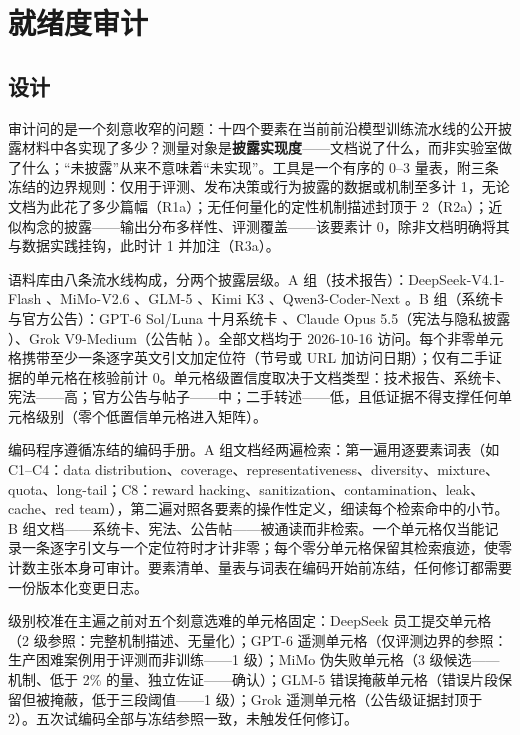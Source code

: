 \documentclass[10pt,fontset=fandol]{ctexart}
\begin{document}
\section{就绪度审计}

\subsection{设计}

审计问的是一个刻意收窄的问题：十四个要素在当前前沿模型训练流水线的公开披露材料中各实现了多少？测量对象是\textbf{披露实现度}——文档说了什么，而非实验室做了什么；“未披露”从来不意味着“未实现”。工具是一个有序的 0--3 量表，附三条冻结的边界规则：仅用于评测、发布决策或行为披露的数据或机制至多计 1，无论文档为此花了多少篇幅（R1a）；无任何量化的定性机制描述封顶于 2（R2a）；近似构念的披露——输出分布多样性、评测覆盖——该要素计 0，除非文档明确将其与数据实践挂钩，此时计 1 并加注（R3a）。

语料库由八条流水线构成，分两个披露层级。A 组（技术报告）：DeepSeek-V4.1-Flash \cite{ref20}、MiMo-V2.6 \cite{ref26}、GLM-5 \cite{ref27}、Kimi K3 \cite{ref31}、Qwen3-Coder-Next \cite{ref28}。B 组（系统卡与官方公告）：GPT-6 Sol/Luna 十月系统卡 \cite{ref22}、Claude Opus 5.5（宪法与隐私披露 \cite{ref54,ref62}）、Grok V9-Medium（公告帖 \cite{ref21}）。全部文档均于 2026-10-16 访问。每个非零单元格携带至少一条逐字英文引文加定位符（节号或 URL 加访问日期）；仅有二手证据的单元格在核验前计 0。单元格级置信度取决于文档类型：技术报告、系统卡、宪法——高；官方公告与帖子——中；二手转述——低，且低证据不得支撑任何单元格级别（零个低置信单元格进入矩阵）。

编码程序遵循冻结的编码手册。A 组文档经两遍检索：第一遍用逐要素词表（如 C1--C4：data distribution、coverage、representativeness、diversity、mixture、quota、long-tail；C8：reward hacking、sanitization、contamination、leak、cache、red team），第二遍对照各要素的操作性定义，细读每个检索命中的小节。B 组文档——系统卡、宪法、公告帖——被通读而非检索。一个单元格仅当能记录一条逐字引文与一个定位符时才计非零；每个零分单元格保留其检索痕迹，使零计数主张本身可审计。要素清单、量表与词表在编码开始前冻结，任何修订都需要一份版本化变更日志。

级别校准在主遍之前对五个刻意选难的单元格固定：DeepSeek 员工提交单元格（2 级参照：完整机制描述、无量化）；GPT-6 遥测单元格（仅评测边界的参照：生产困难案例用于评测而非训练——1 级）；MiMo 伪失败单元格（3 级候选——机制、低于 2\% 的量、独立佐证——确认）；GLM-5 错误掩蔽单元格（错误片段保留但被掩蔽，低于三段阈值——1 级）；Grok 遥测单元格（公告级证据封顶于 2）。五次试编码全部与冻结参照一致，未触发任何修订。
\end{document}
